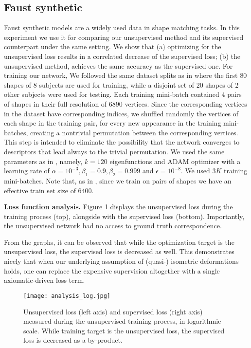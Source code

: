 \documentclass[10pt,twocolumn,letterpaper]{article}
\begin{document}
\subsection{Faust synthetic}
Faust synthetic models \cite{faust} are a widely used data in shape matching tasks. In this experiment we use it for comparing our unsupervised method and its supervised counterpart under the same setting. We show that (a) optimizing for the unsupervised loss results in a correlated decrease of the supervised loss; (b) the  unsupervised method, achieves the same accuracy as the supervised one.
For training our network, We followed the same dataset splits as in \cite{litany2017deep} where the first $80$ shapes of $8$ subjects are used for training, while a disjoint set of $20$ shapes of $2$ other subjects were used for testing. Each training mini-batch contained $4$ pairs of shapes in their full resolution of $6890$ vertices. Since the corresponding vertices in the dataset have corresponding indices, we shuffled randomly the vertices of each shape in the training pair, for every new appearance in the training mini-batches, creating a nontrivial permutation between the corresponding vertices. This step is intended to eliminate the possibility that the network converges to descriptors that lead always to the trivial permutation. We used the same parameters as in \cite{litany2017deep}, namely, $k=120$ eigenfunctions and ADAM optimizer with a learning rate of $\alpha = 10^{-3}, \beta_1 = 0.9, \beta_2 = 0.999$ and $\epsilon = 10^{-8}$. We used $3K$ training mini-batches. Note that, as in \cite{litany2017deep}, since we train on pairs of shapes we have an effective train set size of $6400$.

\vspace{1ex}\noindent\textbf{Loss function analysis.}
Figure \ref{fig:anal} displays the unsupervised loss during the training process (top), alongside with the supervised loss (bottom). Importantly, the unsupervised network had no access to ground truth correspondence.  

From the graphs, it can be observed that while the optimization target is the unsupervised loss, the supervised loss is decreased as well. This demonstrates nicely that when our underlying assumption of (quasi-) isometric deformations holds, one can replace the expensive supervision altogether with a single axiomatic-driven loss term. 
\begin{figure}
    \texttt{[image: analysis\_log.jpg]}
    \caption{Unsupervised loss (left axis) and supervised loss (right axis) measured during the unsupervised training process, in logarithmic scale. While training target is the unsupervised loss, the supervised loss is decreased as a by-product.}
    \label{fig:anal}
\end{figure}
\end{document}
